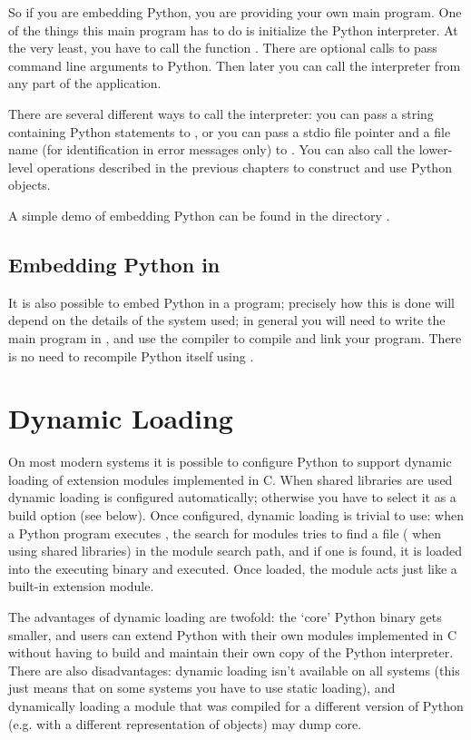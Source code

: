 So if you are embedding Python, you are providing your own main
program.  One of the things this main program has to do is initialize
the Python interpreter.  At the very least, you have to call the
function .  There are optional calls to pass command
line arguments to Python.  Then later you can call the interpreter
from any part of the application.

There are several different ways to call the interpreter: you can pass
a string containing Python statements to ,
or you can pass a stdio file pointer and a file name (for
identification in error messages only) to .  You
can also call the lower-level operations described in the previous
chapters to construct and use Python objects.

A simple demo of embedding Python can be found in the directory
.


\section{Embedding Python in \Cpp{}}

It is also possible to embed Python in a \Cpp{} program; precisely how this
is done will depend on the details of the \Cpp{} system used; in general you
will need to write the main program in \Cpp{}, and use the \Cpp{} compiler
to compile and link your program.  There is no need to recompile Python
itself using \Cpp{}.


\chapter{Dynamic Loading}

On most modern systems it is possible to configure Python to support
dynamic loading of extension modules implemented in C.  When shared
libraries are used dynamic loading is configured automatically;
otherwise you have to select it as a build option (see below).  Once
configured, dynamic loading is trivial to use: when a Python program
executes , the search for modules tries to find a
file  ( when using shared
libraries) in the module search path, and if one is found, it is
loaded into the executing binary and executed.  Once loaded, the
module acts just like a built-in extension module.

The advantages of dynamic loading are twofold: the `core' Python
binary gets smaller, and users can extend Python with their own
modules implemented in C without having to build and maintain their
own copy of the Python interpreter.  There are also disadvantages:
dynamic loading isn't available on all systems (this just means that
on some systems you have to use static loading), and dynamically
loading a module that was compiled for a different version of Python
(e.g. with a different representation of objects) may dump core.


